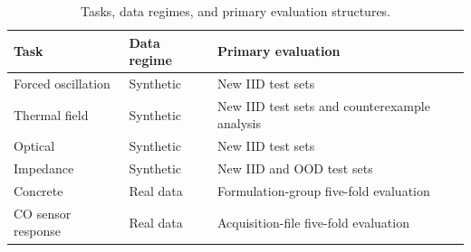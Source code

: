 \begin{table}[t]
\centering
\caption{Tasks, data regimes, and primary evaluation structures.}
\label{tab:task-protocol}
\small
\begin{tabular}{@{}p{}p{}p{}@{}}
\toprule
Task & Data regime & Primary evaluation \\
\midrule
Forced oscillation & Synthetic & New IID test sets \\
Thermal field & Synthetic & New IID test sets and counterexample analysis \\
Optical & Synthetic & New IID test sets \\
Impedance & Synthetic & New IID and OOD test sets \\
Concrete \cite{Yeh1998Concrete} & Real data & Formulation-group five-fold evaluation \\
CO sensor response \cite{Burgus2018GasData} & Real data & Acquisition-file five-fold evaluation \\
\bottomrule
\end{tabular}
\end{table}

